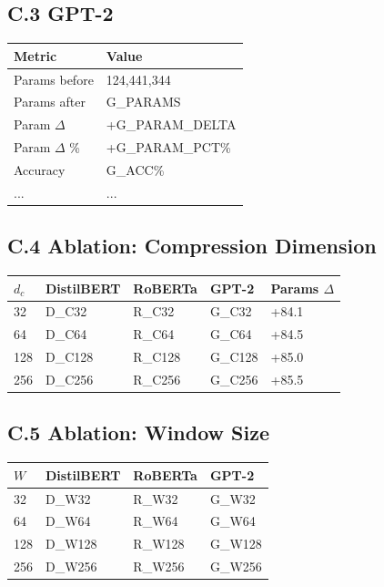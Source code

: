 \subsection{C.3 GPT-2}

\begin{table}[H]
\centering
\small
\begin{tabular}{ll}
\toprule
\textbf{Metric} & \textbf{Value} \\
\midrule
Params before & 124,441,344 \\
Params after & {{G\_PARAMS}} \\
Param $\Delta$ & +{{G\_PARAM\_DELTA}} \\
Param $\Delta$ \% & +{{G\_PARAM\_PCT}}\% \\
Accuracy & {{G\_ACC}}\% \\
... & ... \\
\bottomrule
\end{tabular}
\end{table}

\subsection{C.4 Ablation: Compression Dimension}

\begin{table}[H]
\centering
\small
\begin{tabular}{lllll}
\toprule
\textbf{$d_c$} & \textbf{DistilBERT} & \textbf{RoBERTa} & \textbf{GPT-2} & \textbf{Params $\Delta$} \\
\midrule
32 & {{D\_C32}} & {{R\_C32}} & {{G\_C32}} & +84.1 \\
64 & {{D\_C64}} & {{R\_C64}} & {{G\_C64}} & +84.5 \\
128 & {{D\_C128}} & {{R\_C128}} & {{G\_C128}} & +85.0 \\
256 & {{D\_C256}} & {{R\_C256}} & {{G\_C256}} & +85.5 \\
\bottomrule
\end{tabular}
\end{table}

\subsection{C.5 Ablation: Window Size}

\begin{table}[H]
\centering
\small
\begin{tabular}{llll}
\toprule
\textbf{$W$} & \textbf{DistilBERT} & \textbf{RoBERTa} & \textbf{GPT-2} \\
\midrule
32 & {{D\_W32}} & {{R\_W32}} & {{G\_W32}} \\
64 & {{D\_W64}} & {{R\_W64}} & {{G\_W64}} \\
128 & {{D\_W128}} & {{R\_W128}} & {{G\_W128}} \\
256 & {{D\_W256}} & {{R\_W256}} & {{G\_W256}} \\
\bottomrule
\end{tabular}
\end{table}

